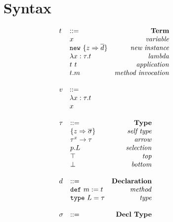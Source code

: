 

\section{Syntax}

\begin{figure}[h]
\[
\begin{array}{lllll}
\begin{array}{llr}
t 		& ::= 														&\text{\bf{Term}} \\
		& x 														&\text{\emph{variable}}\\
		& \texttt{new} \ \{z \Rightarrow \overline{d}\}	&\text{\emph{new instance}}\\
		& \lambda x:\tau.t 										&\text{\emph{lambda}}\\
		& t\ t 													&\text{\emph{application}}\\
		& t.m 														&\text{\emph{method invocation}}\\
&&\\
v 		& ::= 														&\\
		& \lambda x:\tau.t										&\\
		& x 										&\\
 \end{array}\\
& ~~~~~~
&\\
\begin{array}{llr}
\tau 	& ::= 														&\text{\bf{Type}} \\
		& \{z \Rightarrow \overline{\sigma}\}			&\text{\emph{self type}}\\
		& \tau^x \rightarrow \tau 							&\text{\emph{arrow}}\\
		& p.L 														&\text{\emph{selection}}\\
		& \top 													&\text{\emph{top}}\\
		& \bot 													&\text{\emph{bottom}}\\
&&\\
d 		& ::= 														&\text{\bf{Declaration}} \\
  		& \text{\texttt{def}} \ m : = t 				&\text{\emph{method}}\\
  		& \text{\texttt{type}} \ L = \tau					&\text{\emph{type}}\\
&&\\
\sigma	& ::= 														&\text{\bf{Decl Type}}\\

\end{array}
\end{array}\]
\end{figure}
